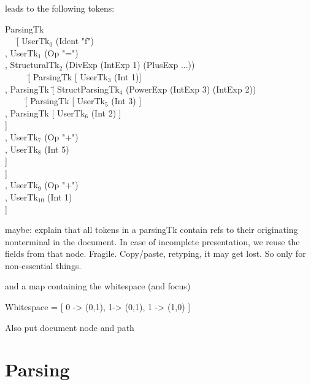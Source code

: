 \documentclass[12pt]{article}
\begin{document}
leads to the following tokens:
\begin{tabbedCode}
ParsingTk \= \\
~~ \= [ UserTk$_0$ (Ident "f") \\
      \> , UserTk$_1$ (Op "=") \\
      \> , StructuralTk$_2$ (DivExp (IntExp 1) (PlusExp ...))\\
      \> ~~ ~~ \= [ ParsingTk [ UserTk$_3$ (Int 1)] \\
      \>            \>  , ParsingTk  \= [ StructParsingTk$_4$ (PowerExp (IntExp 3) (IntExp 2))\\
      \>            \>                 \> ~~~~ \= [ ParsingTk [ UserTk$_5$ (Int 3) ] \\
      \>            \>                 \>           \>  , ParsingTk [ UserTk$_6$ (Int 2) ] \\
      \>            \>                 \>           \> ] \\
      \>            \>                 \> , UserTk$_7$ (Op "+") \\
      \>            \>                 \> , UserTk$_8$ (Int 5) \\
      \>            \>                 \> ] \\
      \>            \> ] \\
      \> , UserTk$_9$ (Op "+") \\
      \> , UserTk$_{10}$ (Int 1) \\
      \> ] \\
\end{tabbedCode}

maybe: explain that all tokens in a parsingTk contain refs to their originating nonterminal in the document. In case of incomplete presentation, we reuse the fields from that node. Fragile. Copy/paste, retyping, it may get lost. So only for non-essential things. 

and a map containing the whitespace (and focus)

\begin{tabbedCode}
Whitespace = [ 0 -> (0,1), 1-> (0,1), 1 -> (1,0) ]
\end{tabbedCode}

Also put document node and path




%
\section{Parsing}
%
\end{document}
